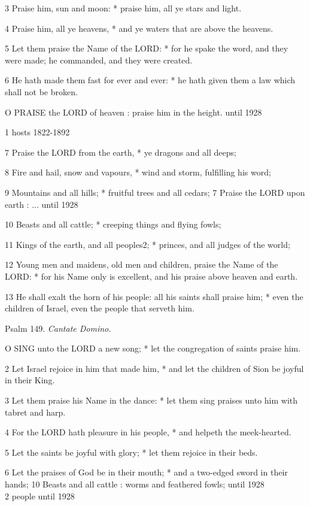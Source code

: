3 Praise him, sun and moon: * praise him, all ye stars
and light.

4 Praise him, all ye heavens, * and ye waters that
are above the heavens.

5 Let them praise the Name of the LORD: * for he spake
the word, and they were made; he commanded, and they were created.

6 He hath made them fast for ever and ever: * he hath
given them a law which shall not be broken.

O PRAISE the LORD
of heaven : praise him in the height. until
1928 

1 hosts 1822-1892

7 Praise the LORD from the earth, * ye dragons and
all deeps;

8 Fire and hail, snow and vapours, * wind and storm,
fulfilling his word;

9 Mountains and all hills; * fruitful trees and all cedars; 7 Praise the LORD
upon earth : ... until
1928

10 Beasts and all cattle; * creeping things and flying fowls;

11 Kings of the earth, and all peoples2;
* princes, and all judges of the world;

12 Young men and maidens, old men and children, praise
the Name of the LORD: * for his Name only is excellent, and his praise
above heaven and earth.

13 He shall exalt the horn of his people: all his saints
shall praise him; * even the children of Israel, even the people that
serveth him.

Psalm
149. \emph{Cantate Domino.}

O
SING unto the LORD a new song; * let the congregation of saints praise
him.

2 Let Israel rejoice in him that made him, * and let
the children of Sion be joyful in their King.

3 Let them praise his Name in the dance: * let them
sing praises unto him with tabret and harp.

4 For the LORD hath pleasure in his people, * and helpeth
the meek-hearted.

5 Let the saints be joyful with glory; * let them rejoice
in their beds.

6 Let the praises of God be in their mouth; * and a
two-edged sword in their hands; 10 Beasts and all cattle :
worms and feathered fowls; until
1928 \\
2 people until
1928

